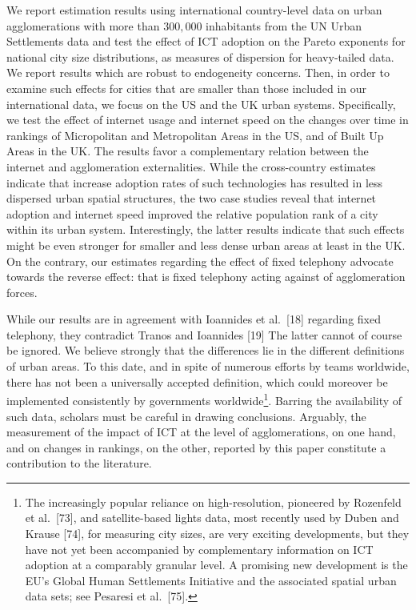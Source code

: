 \documentclass[10pt,letterpaper]{article}
\begin{document}
We report estimation results using international country-level data on
urban agglomerations with more than \(300,000\) inhabitants from the UN
Urban Settlements data and test the effect of ICT adoption on the Pareto
exponents for national city size distributions, as measures of
dispersion for heavy-tailed data. We report results which are robust to
endogeneity concerns. Then, in order to examine such effects for cities
that are smaller than those included in our international data, we focus
on the US and the UK urban systems. Specifically, we test the effect of
internet usage and internet speed on the changes over time in rankings
of Micropolitan and Metropolitan Areas in the US, and of Built Up Areas
in the UK. The results favor a complementary relation between the
internet and agglomeration externalities. While the cross-country
estimates indicate that increase adoption rates of such technologies has
resulted in less dispersed urban spatial structures, the two case
studies reveal that internet adoption and internet speed improved the
relative population rank of a city within its urban system.
Interestingly, the latter results indicate that such effects might be
even stronger for smaller and less dense urban areas at least in the UK.
On the contrary, our estimates regarding the effect of fixed telephony
advocate towards the reverse effect: that is fixed telephony acting
against of agglomeration forces.

While our results are in agreement with Ioannides et al.~{[}18{]}
regarding fixed telephony, they contradict Tranos and Ioannides {[}19{]}
The latter cannot of course be ignored. We believe strongly that the
differences lie in the different definitions of urban areas. To this
date, and in spite of numerous efforts by teams worldwide, there has not
been a universally accepted definition, which could moreover be
implemented consistently by governments worldwide\footnote{The
  increasingly popular reliance on high-resolution, pioneered by
  Rozenfeld et al.~{[}73{]}, and satellite-based lights data, most
  recently used by Duben and Krause {[}74{]}, for measuring city sizes,
  are very exciting developments, but they have not yet been accompanied
  by complementary information on ICT adoption at a comparably granular
  level. A promising new development is the EU's Global Human
  Settlements Initiative and the associated spatial urban data sets; see
  Pesaresi et al.~{[}75{]}.}. Barring the availability of such data,
scholars must be careful in drawing conclusions. Arguably, the
measurement of the impact of ICT at the level of agglomerations, on one
hand, and on changes in rankings, on the other, reported by this paper
constitute a contribution to the literature.
\end{document}
